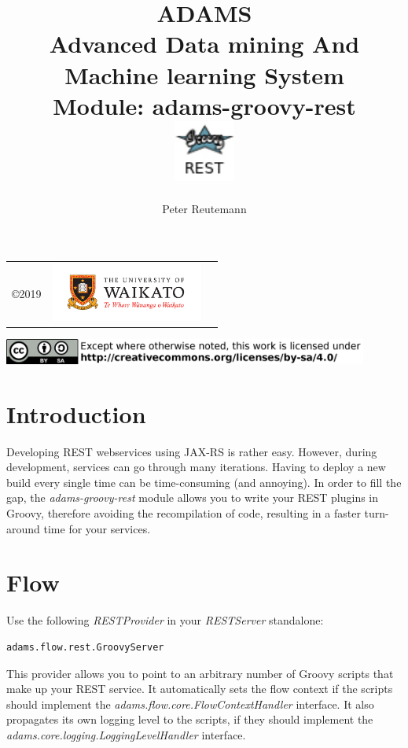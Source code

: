 \documentclass[a4paper]{book}
\title{
  \textbf{ADAMS} \\
  {\Large \textbf{A}dvanced \textbf{D}ata mining \textbf{A}nd \textbf{M}achine
  learning \textbf{S}ystem} \\
  {\Large Module: adams-groovy-rest} \\
  \vspace{1cm}
  \includegraphics[width=2cm]{images/groovy-rest-module.png} \\
}
\author{
  Peter Reutemann
}
\begin{document}
\begin{titlepage}
\maketitle

\thispagestyle{empty}
\center
\begin{table}[b]
	\begin{tabular}{c l l}
		\parbox[c][2cm]{2cm}{\copyright 2019} &
		\parbox[c][2cm]{5cm}{\includegraphics[width=5cm]{images/coat_of_arms.pdf}} \\
	\end{tabular}
	\includegraphics[width=12cm]{images/cc.png} \\
\end{table}

\end{titlepage}

\tableofcontents

\chapter{Introduction}
Developing REST webservices using JAX-RS\cite{jax-rs} is rather easy. However,
during development, services can go through many iterations. Having to deploy
a new build every single time can be time-consuming (and annoying).
In order to fill the gap, the \textit{adams-groovy-rest} module allows you
to write your REST plugins in Groovy\cite{groovy}, therefore avoiding the
recompilation of code, resulting in a faster turn-around time for your services.

\chapter{Flow}
Use the following \textit{RESTProvider} in your \textit{RESTServer} standalone:
\begin{verbatim}
adams.flow.rest.GroovyServer
\end{verbatim}
\noindent This provider allows you to point to an arbitrary number of Groovy
scripts that make up your REST service. It automatically sets the flow context
if the scripts should implement the \textit{adams.flow.core.FlowContextHandler}
interface. It also propagates its own logging level to the scripts, if they
should implement the \textit{adams.core.logging.LoggingLevelHandler} interface.
\end{document}
